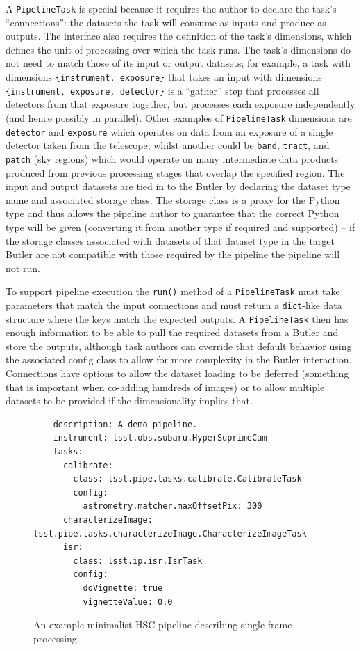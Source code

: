\documentclass[]{spie}
\begin{document}
A \texttt{PipelineTask} is special because it requires the author to declare the task's ``connections'': the datasets the task will consume as inputs and produce as outputs.
The interface also requires the definition of the task's dimensions, which defines the unit of processing over which the task runs.
The task's dimensions do not need to match those of its input or output datasets; for example, a task with dimensions \texttt{\{instrument, exposure\}} that takes an input with dimensions \texttt{\{instrument, exposure, detector\}} is a ``gather'' step that processes all detectors from that exposure together, but processes each exposure independently (and hence possibly in parallel).
Other examples of \texttt{PipelineTask} dimensions are \texttt{detector} and \texttt{exposure} which operates on data from an exposure of a single detector taken from the telescope, whilst another could be \texttt{band}, \texttt{tract}, and \texttt{patch} (sky regions) which would operate on many intermediate data products produced from previous processing stages that overlap the specified region.
The input and output datasets are tied in to the Butler by declaring the dataset type name and associated storage class.
The storage class is a proxy for the Python type and thus allows the pipeline author to guarantee that the correct Python type will be given (converting it from another type if required and supported) -- if the storage classes associated with datasets of that dataset type in the target Butler are not compatible with those required by the pipeline the pipeline will not run.

To support pipeline execution the \texttt{run()} method of a \texttt{PipelineTask} must take parameters that match the input connections and must return a \texttt{dict}-like data structure where the keys match the expected outputs.
A \texttt{PipelineTask} then has enough information to be able to pull the required datasets from a Butler and store the outputs, although task authors can override that default behavior using the associated config class to allow for more complexity in the Butler interaction.
Connections have options to allow the dataset loading to be deferred (something that is important when co-adding hundreds of images) or to allow multiple datasets to be provided if the dimensionality implies that.

\begin{figure}
  \lstset{language=YAML,basicstyle=\small\ttfamily}
  \begin{lstlisting}
    description: A demo pipeline.
    instrument: lsst.obs.subaru.HyperSuprimeCam
    tasks:
      calibrate:
        class: lsst.pipe.tasks.calibrate.CalibrateTask
        config:
          astrometry.matcher.maxOffsetPix: 300
      characterizeImage: lsst.pipe.tasks.characterizeImage.CharacterizeImageTask
      isr:
        class: lsst.ip.isr.IsrTask
        config:
          doVignette: true
          vignetteValue: 0.0
    \end{lstlisting}
  \caption{An example minimalist HSC pipeline describing single frame processing.}
  \label{fig:pipeline}
\end{figure}
\end{document}
